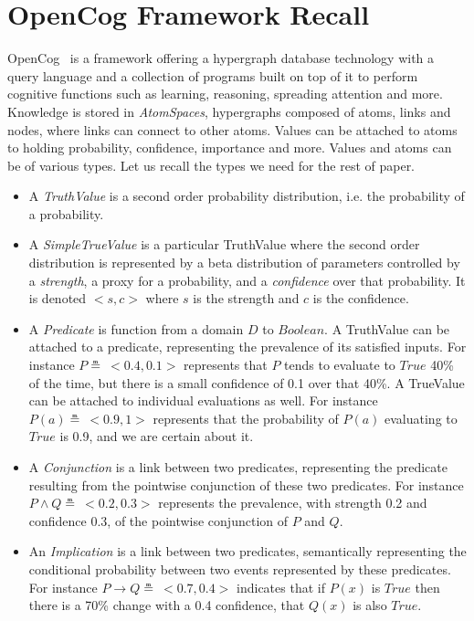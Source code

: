 \documentclass[runningheads]{llncs}
\newcommand{\limp}{\rightarrow}
\begin{document}
\section{OpenCog Framework Recall}
\label{sec:opencog}
OpenCog~\cite{Hart2008} is a framework offering a hypergraph database
technology with a query language and a collection of programs built on
top of it to perform cognitive functions such as learning, reasoning,
spreading attention and more.  Knowledge is stored in
\emph{AtomSpaces}, hypergraphs composed of atoms, links and nodes,
where links can connect to other atoms.  Values can be attached to
atoms to holding probability, confidence, importance and more.  Values
and atoms can be of various types.  Let us recall the types we need
for the rest of paper.
\begin{itemize}
\item A \emph{TruthValue} is a second order probability distribution,
  i.e. the probability of a probability.
\item A \emph{SimpleTrueValue} is a particular TruthValue where the
  second order distribution is represented by a beta distribution of
  parameters controlled by a \emph{strength}, a proxy for a
  probability, and a \emph{confidence} over that probability.  It is
  denoted $<\!s, c\!>$ where $s$ is the strength and $c$ is the
  confidence.
\item A \emph{Predicate} is function from a domain $D$ to $Boolean$.
  A TruthValue can be attached to a predicate, representing the
  prevalence of its satisfied inputs.  For instance
  $P \measeq\ <\!0.4, 0.1\!>$ represents that $P$ tends to evaluate to
  $\textit{True}$ 40\% of the time, but there is a small confidence of
  0.1 over that 40\%.  A TrueValue can be attached to individual
  evaluations as well.  For instance $P(a) \measeq\ <\!0.9, 1\!>$
  represents that the probability of $P(a)$ evaluating to
  $\textit{True}$ is 0.9, and we are certain about it.
\item A \emph{Conjunction} is a link between two predicates,
  representing the predicate resulting from the pointwise conjunction
  of these two predicates.  For instance
  $P \land Q \measeq\ <\!0.2, 0.3\!>$ represents the prevalence, with
  strength 0.2 and confidence 0.3, of the pointwise conjunction of $P$
  and $Q$.
\item An \emph{Implication} is a link between two predicates,
  semantically representing the conditional probability between two
  events represented by these predicates.  For instance
  $P \limp Q \measeq\ <\!0.7, 0.4\!>$ indicates that if $P(x)$ is
  $\textit{True}$ then there is a 70\% change with a 0.4 confidence,
  that $Q(x)$ is also $\textit{True}$.
\end{itemize}
\end{document}
